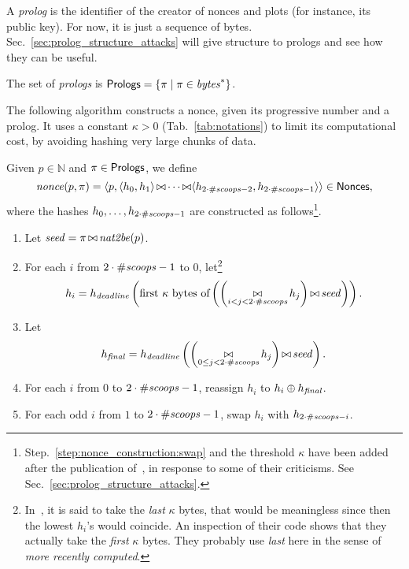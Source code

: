 A \emph{prolog} is the identifier of the creator of nonces and plots (for instance, its public key).
For now, it is just a sequence of bytes. Sec.~\ref{sec:prolog_structure_attacks}
will give structure to prologs and see how they can be useful.
%
\begin{definition}[Prolog]\label{def:prolog}
  The set of \emph{prologs} is ${\mathsf{Prologs}}=\{\pi\mid\pi\in\mathit{bytes}^*\}$.
\end{definition}
%
The following algorithm constructs a nonce, given its progressive number and a prolog.
It uses a constant $\kappa>0$ (Tab.~\ref{tab:notations})
to limit its computational cost, by avoiding hashing very large chunks of data.
%
\begin{alg}[$\nonce(p,\pi)$]\label{alg:nonce_construction}
  Given $p\in\mathbb{N}$ and $\pi\in{\mathsf{Prologs}}$, we define
  \[
  {\mathit{nonce}}(p,\pi)=\langle p,\langle h_0,h_1\rangle\operatorname*{\bowtie}
  \cdots\operatorname*{\bowtie}\langle h_{2\cdot{\#\mathit{scoops}}-2},h_{2\cdot{\#\mathit{scoops}}-1}\rangle\rangle\in{\mathsf{Nonces}},
  \]
  where the hashes $h_0,\ldots,h_{2\cdot{\#\mathit{scoops}}-1}$ are constructed as
  follows\footnote{Step.~\ref{step:nonce_construction:swap} and the threshold $\kappa$
  have been added after the publication of~\cite{ParkKFGAP18},
  in response to some of their criticisms.
  See Sec.~\ref{sec:prolog_structure_attacks}.}.
  \begin{enumerate}
  \item Let ${\mathit{seed}}=\pi\operatorname*{\bowtie}{\mathit{nat2be}}(p)$.
  \item\label{step:nonce_construction:first_hash}
    For each $i$ from $2\cdot{\#\mathit{scoops}}-1$ to $0$,
    let\footnote{In~\cite{SignumPlotting}, it is said to
    take the \emph{last} $\kappa$ bytes, that would be meaningless since then
    the lowest $h_i$'s would coincide. An inspection of their code
    shows that they actually take the \emph{first} $\kappa$ bytes. They
    probably use \emph{last} here in the sense of \emph{more recently computed}.}
    \[
    h_i=h_{\mathit{deadline}}\left(\text{first $\kappa$ bytes of}\left(\left(\operatorname*{\bowtie}_{i<j<2\cdot{\#\mathit{scoops}}}h_j\right)\operatorname*{\bowtie}{\mathit{seed}}\right)\right).
    \]
  \item\label{step:nonce_construction:final_hash}
    Let
    \[
    {h_{\mathit{final}}}=h_{\mathit{deadline}}\left(\left(\operatorname*{\bowtie}_{0\le j<2\cdot{\#\mathit{scoops}}}h_j\right)\operatorname*{\bowtie}{\mathit{seed}}\right).
    \]
  \item For each $i$ from $0$ to $2\cdot{\#\mathit{scoops}}-1$, reassign
    $h_i$ to $h_i\oplus{h_{\mathit{final}}}$.
  \item\label{step:nonce_construction:swap}
    For each odd $i$ from $1$ to $2\cdot{\#\mathit{scoops}}-1$, swap
    $h_i$ with $h_{2\cdot{\#\mathit{scoops}}-i}$.
  \end{enumerate}
\end{alg}
